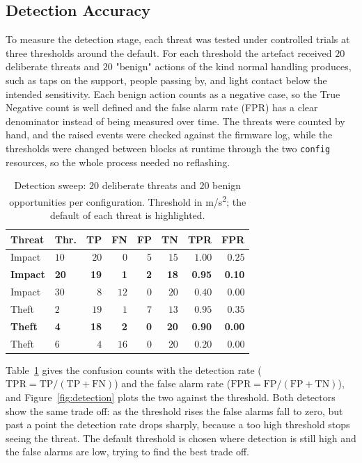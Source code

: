 \documentclass[conference]{IEEEtran}
\begin{document}
\subsection{Detection Accuracy}
\label{sec:detection}
To measure the detection stage, each threat was tested under controlled trials at three thresholds around the default. For each threshold the artefact received $20$ deliberate threats and $20$ "benign" actions of the kind normal handling produces, such as taps on the support, people passing by, and light contact below the intended sensitivity. Each benign action counts as a negative case, so the True Negative count is well defined and the false alarm rate (FPR) has a clear denominator instead of being measured over time. The threats were counted by hand, and the raised events were checked against the firmware log, while the thresholds were changed between blocks at runtime through the two \texttt{config} resources, so the whole process needed no reflashing.

\begin{table}[htbp]
\caption{Detection sweep: $20$ deliberate threats and $20$ benign opportunities per configuration. Threshold in m/s\textsuperscript{2}; the default of each threat is highlighted.}
\label{tab:detection}
\centering
\footnotesize
\begin{tabular}{@{}llrrrrrr@{}}
\toprule
\textbf{Threat} & \textbf{Thr.} & \textbf{TP} & \textbf{FN} & \textbf{FP} & \textbf{TN} & \textbf{TPR} & \textbf{FPR} \\
\midrule
Impact & $10$ & $20$ & $0$ & $5$ & $15$ & $1.00$ & $0.25$ \\
\textbf{Impact} & \textbf{20} & \textbf{19} & \textbf{1} & \textbf{2} & \textbf{18} & \textbf{0.95} & \textbf{0.10} \\
Impact & $30$ & $8$  & $12$ & $0$ & $20$ & $0.40$ & $0.00$ \\
\midrule
Theft & $2$ & $19$ & $1$ & $7$ & $13$ & $0.95$ & $0.35$ \\
\textbf{Theft} & \textbf{4} & \textbf{18} & \textbf{2} & \textbf{0} & \textbf{20} & \textbf{0.90} & \textbf{0.00} \\
Theft & $6$ & $4$  & $16$ & $0$ & $20$ & $0.20$ & $0.00$ \\
\bottomrule
\end{tabular}
\end{table}

Table~\ref{tab:detection} gives the confusion counts with the detection rate ($\mathrm{TPR}=\mathrm{TP}/(\mathrm{TP}+\mathrm{FN})$) and the false alarm rate ($\mathrm{FPR}=\mathrm{FP}/(\mathrm{FP}+\mathrm{TN})$), and Figure~\ref{fig:detection} plots the two against the threshold. Both detectors show the same trade off: as the threshold rises the false alarms fall to zero, but past a point the detection rate drops sharply, because a too high threshold stops seeing the threat. The default threshold is chosen where detection is still high and the false alarms are low, trying to find the best trade off.
\end{document}
